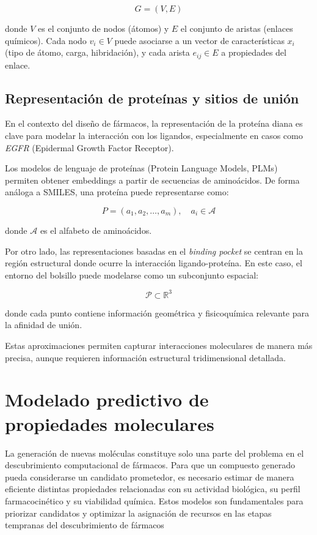 \documentclass[IB]{TFUOC}%
\begin{document}
\begin{equation}
G = (V, E)
\end{equation}

donde $V$ es el conjunto de nodos (átomos) y $E$ el conjunto de aristas (enlaces químicos). Cada nodo $v_i \in V$ puede asociarse a un vector de características $x_i$ (tipo de átomo, carga, hibridación), y cada arista $e_{ij} \in E$ a propiedades del enlace.

\subsection{Representación de proteínas y sitios de unión}

En el contexto del diseño de fármacos, la representación de la proteína diana es clave para modelar la interacción con los ligandos, especialmente en casos como \textit{EGFR} (Epidermal Growth Factor Receptor).

Los modelos de lenguaje de proteínas (Protein Language Models, PLMs) permiten obtener embeddings a partir de secuencias de aminoácidos. De forma análoga a SMILES, una proteína puede representarse como:

\begin{equation}
P = (a_1, a_2, \dots, a_m), \quad a_i \in \mathcal{A}
\end{equation}

donde $\mathcal{A}$ es el alfabeto de aminoácidos.

Por otro lado, las representaciones basadas en el \textit{binding pocket} se centran en la región estructural donde ocurre la interacción ligando-proteína. En este caso, el entorno del bolsillo puede modelarse como un subconjunto espacial:

\begin{equation}
\mathcal{P} \subset \mathbb{R}^3
\end{equation}

donde cada punto contiene información geométrica y fisicoquímica relevante para la afinidad de unión.

Estas aproximaciones permiten capturar interacciones moleculares de manera más precisa, aunque requieren información estructural tridimensional detallada.


\section{Modelado predictivo de propiedades moleculares}

La generación de nuevas moléculas constituye solo una parte del problema en el descubrimiento computacional de fármacos. Para que un compuesto generado pueda considerarse un candidato prometedor, es necesario estimar de manera eficiente distintas propiedades relacionadas con su actividad biológica, su perfil farmacocinético y su viabilidad química. Estos modelos son fundamentales para priorizar candidatos y optimizar la asignación de recursos en las etapas tempranas del descubrimiento de fármacos
\end{document}
